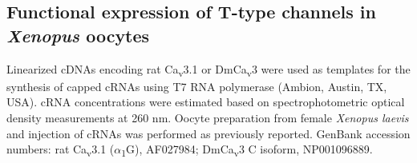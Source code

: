 \subsection*{Functional expression of T-type channels in \emph{Xenopus} oocytes}

Linearized cDNAs encoding rat Ca\textsubscript{v}3.1 or DmCa\textsubscript{v}3 were used as templates for the synthesis of capped cRNAs using T7 RNA polymerase (Ambion, Austin, TX, USA).
cRNA concentrations were estimated based on spectrophotometric optical density measurements at 260 nm.
Oocyte preparation from female \emph{Xenopus laevis} and injection of cRNAs was performed as previously reported\cite{kang:2006aa}.
GenBank accession numbers: rat Ca\textsubscript{v}3.1 ($\alpha$\textsubscript{1}G), AF027984\cite{PerezReyes:1998gn}; DmCa\textsubscript{v}3 C isoform, NP001096889.
